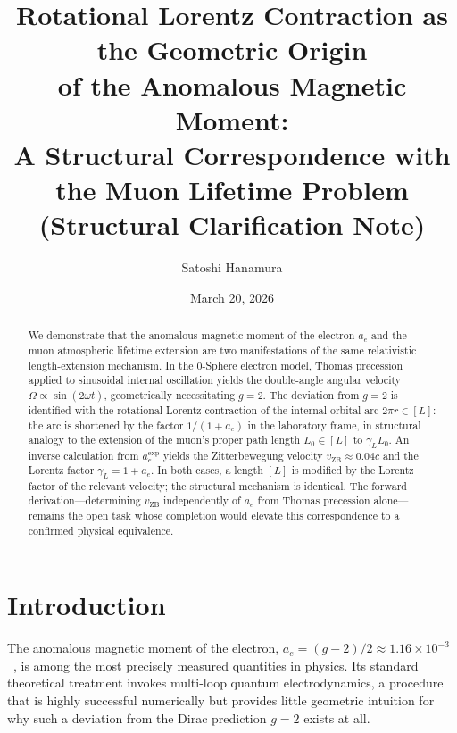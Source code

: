 \documentclass[%
 reprint, amsmath,amssymb, aps, prb, ]{revtex4-2}
\numberwithin{equation}{section}
\newcommand{\vZB}{v_{\text{ZB}}}
\newcommand{\aexp}{a_{e}^{\text{exp}}}
\newcommand{\gammaL}{\gamma_{L}}
\begin{document}
\title{Rotational Lorentz Contraction as the Geometric Origin \\of the Anomalous Magnetic Moment: \\A Structural Correspondence with the Muon Lifetime Problem\\
{\normalsize (Structural Clarification Note)}}

\author{Satoshi Hanamura}
\date{March 20, 2026}

\begin{abstract}
We demonstrate that the anomalous magnetic moment of the electron $a_e$ and the muon atmospheric lifetime extension are two manifestations of the same relativistic length-extension mechanism.
In the 0-Sphere electron model, Thomas precession applied to sinusoidal internal oscillation yields the double-angle angular velocity $\Omega \propto \sin(2\omega t)$, geometrically necessitating $g = 2$.
The deviation from $g = 2$ is identified with the rotational Lorentz contraction of the internal orbital arc $2\pi r \in [L]$: the arc is shortened by the factor $1/(1+a_e)$ in the laboratory frame, in structural analogy to the extension of the muon's proper path length $L_0 \in [L]$ to $\gamma_L L_0$.
An inverse calculation from $\aexp$ yields the Zitterbewegung velocity $\vZB \approx 0.04c$ and the Lorentz factor $\gammaL = 1 + a_e$.
In both cases, a length $[L]$ is modified by the Lorentz factor of the relevant velocity; the structural mechanism is identical.
The forward derivation---determining $\vZB$ independently of $a_e$ from Thomas precession alone---remains the open task whose completion would elevate this correspondence to a confirmed physical equivalence.
\end{abstract}

\maketitle

\section{\label{sec:intro}Introduction}

The anomalous magnetic moment of the electron, $a_e = (g-2)/2 \approx 1.16\times10^{-3}$~\cite{Hanneke2008}, is among the most precisely measured quantities in physics. Its standard theoretical treatment invokes multi-loop quantum electrodynamics, a procedure that is highly successful numerically but provides little geometric intuition for why such a deviation from the Dirac prediction $g = 2$ exists at all.
\end{document}
